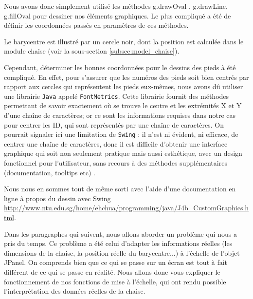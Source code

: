 \documentclass{polytech/polytech}
\begin{document}
Nous avons donc simplement utilisé les méthodes g.drawOval , g.drawLine, g.fillOval pour dessiner nos éléments graphiques.
Le plus compliqué a été de définir les coordonnées passés en paramètres de ces méthodes.

Le barycentre est illustré par un cercle noir, dont la position est calculée dans le module chaise (voir la sous-section \ref{subsec:model_chaise}). 

Cependant, déterminer les bonnes coordonnées pour le dessins des pieds à été compliqué. En effet, pour s'assurer que les numéros des pieds soit bien centrés par rapport aux cercles qui représentent les pieds eux-mêmes, nous avons dû utiliser une librairie \texttt{Java} appelé \texttt{FontMetrics}. 
Cette librairie fournit des méthodes permettant de savoir exactement où se trouve le centre et les extrémités X et Y d'une chaîne de caractères; or ce sont les informations requises dans notre cas pour centrer les ID, qui sont représentés par une chaîne de caractères. 
On pourrait signaler ici une limitation de \texttt{Swing} : il n'est ni évident, ni efficace, de centrer une chaîne de caractères, donc il est difficile d'obtenir une interface graphique qui soit non seulement pratique mais aussi esthétique, avec un design fonctionnel pour l'utilisateur, sans recours à des méthodes supplémentaires (documentation, tooltips etc) .

Nous nous en sommes tout de même sorti avec l'aide d'une documentation en ligne à propos du dessin avec Swing \url{http://www.ntu.edu.sg/home/ehchua/programming/java/J4b_CustomGraphics.html}.


Dans les paragraphes qui suivent, nous allons aborder un problème qui nous a pris du temps. 
Ce problème a été celui d'adapter les informations réelles (les dimensions de la chaise, la position réelle du barycentre...) à l'échelle de l'objet JPanel. On comprends bien que ce qui se passe sur un écran est tout à fait différent de ce qui se passe en réalité. Nous allons donc vous expliquer le fonctionnement de nos fonctions de mise à l'échelle, qui ont rendu possible l'interprétation des données réelles de la chaise.
\end{document}
